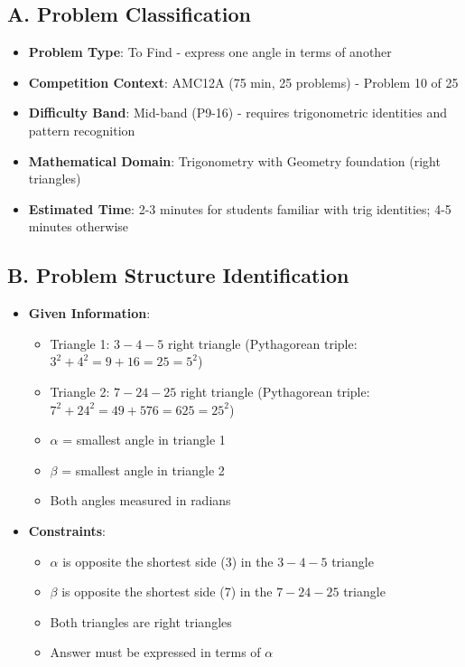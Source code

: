 \documentclass[11pt]{article}
\begin{document}
\begin{problemconfigbox}
\subsection*{A. Problem Classification}
\begin{itemize}[leftmargin=*]
    \item \textbf{Problem Type}: To Find - express one angle in terms of another
    \item \textbf{Competition Context}: AMC12A (75 min, 25 problems) - Problem 10 of 25
    \item \textbf{Difficulty Band}: Mid-band (P9-16) - requires trigonometric identities and pattern recognition
    \item \textbf{Mathematical Domain}: Trigonometry with Geometry foundation (right triangles)
    \item \textbf{Estimated Time}: 2-3 minutes for students familiar with trig identities; 4-5 minutes otherwise
\end{itemize}

\subsection*{B. Problem Structure Identification}
\begin{itemize}[leftmargin=*]
    \item \textbf{Given Information}: 
    \begin{itemize}
        \item Triangle 1: $3{-}4{-}5$ right triangle (Pythagorean triple: $3^2 + 4^2 = 9 + 16 = 25 = 5^2$)
        \item Triangle 2: $7{-}24{-}25$ right triangle (Pythagorean triple: $7^2 + 24^2 = 49 + 576 = 625 = 25^2$)
        \item $\alpha$ = smallest angle in triangle 1
        \item $\beta$ = smallest angle in triangle 2
        \item Both angles measured in radians
    \end{itemize}
    
    \item \textbf{Constraints}: 
    \begin{itemize}
        \item $\alpha$ is opposite the shortest side (3) in the $3{-}4{-}5$ triangle
        \item $\beta$ is opposite the shortest side (7) in the $7{-}24{-}25$ triangle
        \item Both triangles are right triangles
        \item Answer must be expressed in terms of $\alpha$
    \end{itemize}
    

\end{itemize}
\end{problemconfigbox}
\end{document}
